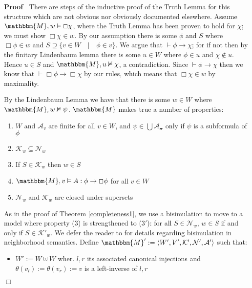 \documentclass{article}
\newcommand{\assign}{:=}
\newcommand{\nin}{\not\in}
\newenvironment{enumeratenumeric}{\begin{enumerate}[1.] }{\end{enumerate}}
\newenvironment{itemizedot}{\begin{itemize} \renewcommand{\labelitemi}{$\bullet$}\renewcommand{\labelitemii}{$\bullet$}\renewcommand{\labelitemiii}{$\bullet$}\renewcommand{\labelitemiv}{$\bullet$}}{\end{itemize}}
\newenvironment{proof}{\noindent\textbf{Proof\ }}{\hspace*{\fill}$\Box$\medskip}
\begin{document}
\begin{proof}
  There are steps of the inductive proof of the Truth Lemma for this structure
  which are not obvious nor obviously documented elsewhere.  Assume
  $\mathbbm{M}, w \vDash \Box \chi$, where the Truth Lemma has been proven to
  hold for $\chi$; we must show $\Box \chi \in w$.  By our assumption there
  is some $\phi$ and $S$ where $\Box \phi \in w$ and $S \supseteq \{v \in W
  \hspace{1em} | \hspace{1em} \phi \in v\}$.  We argue that $\vdash \phi
  \rightarrow \chi$; for if not then by the finitary Lindenbaum lemma there is
  some $u \in W$ where $\phi \in u$ and $\chi \nin u$.  Hence $u \in S$ and
  $\mathbbm{M}, u \nvDash \chi$, a contradiction.  Since $\vdash \phi
  \rightarrow \chi$ then we know that $\vdash \Box \phi \rightarrow \Box \chi$
  by our rules, which means that $\Box \chi \in w$ by maximality.
  
  
  
  By the Lindenbaum Lemma we have that there is some $w \in W$ where
  $\mathbbm{M}, w \nvDash \psi$.  $\mathbbm{M}$ makes true a number of
  properties:
  \begin{enumeratenumeric}
    \item $W$ and $\mathcal{A}_v$ are finite for all $v \in W$, and $\psi \in
    \bigcup \mathcal{A_w}$ only if $\psi$ is a subformula of $\phi$
    
    \item $\mathcal{K}_w \subseteq \mathcal{N}_w$
    
    \item If $S \in \mathcal{K}_w$ then $w \in S$
    
    \item $\mathbbm{M}, v \vDash A : \phi \rightarrow \Box \phi$ for all $v
    \in W$
    
    \item $\mathcal{N}_w$ and $\mathcal{K}_w$ are closed under supersets
  \end{enumeratenumeric}
  
  
  As in the proof of Theorem \ref{completeness1}, we use a bisimulation to
  move to a model where property (3) is strengthened to (3$'$): for all $S \in
  \mathcal{N}_w$, $w \in S$ if and only if $S \in \mathcal{K}'_w$.  We defer
  the reader to {\cite{hansen_bisimulation_2007,pauly_bisimulation_1999}} for
  details regarding bisimulation in neighborhood semantics.  Define
  $\mathbbm{M}' \assign \langle W', V', \mathcal{K}', \mathcal{N}',
  \mathcal{A}' \rangle$ such that:
  \begin{itemizedot}
    \item $W' \assign W \uplus W$ wher.  $l, r$ its associated canonical
    injections and $\theta (v_l) \assign \theta (v_r) \assign v$ is a
    left-inverse of $l, r$
    

\end{itemizedot}
\end{proof}
\end{document}
